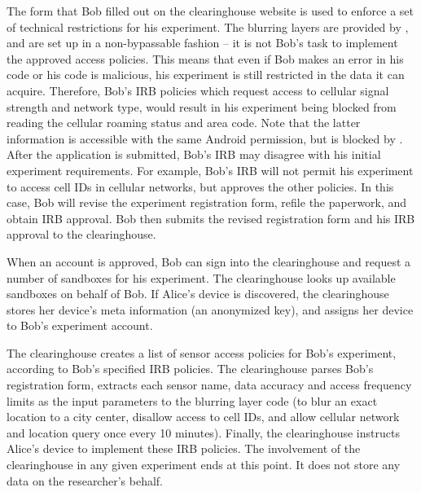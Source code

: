 The form that Bob filled out on the clearinghouse website is used to
enforce a set of technical restrictions for his experiment. 
The blurring layers are provided by 
\sysname, and are set up in a non-bypassable fashion -- it is not 
Bob's task to implement the approved access policies. This means
that even if Bob makes an error in his code or his code is malicious, his 
experiment is still restricted in the data it can acquire. 
Therefore, Bob's IRB 
policies which request access to cellular signal strength and network type, would result 
in his experiment being blocked from reading the cellular roaming status and area 
code. Note that the latter information is accessible with the same 
Android permission, but is blocked by \sysname. 
After the application is submitted, Bob's IRB may disagree with 
his initial experiment requirements. For example, Bob's IRB will not permit
his experiment to access cell IDs in cellular networks, but 
approves the other policies. 
In this case, Bob will revise the experiment registration form, refile the paperwork, 
and obtain IRB approval. Bob then submits the revised  
registration form and his IRB approval to the clearinghouse.

 When an account is approved, Bob 
can sign into the clearinghouse and request a 
number of sandboxes for his experiment. The clearinghouse 
looks up available sandboxes on behalf of Bob. If Alice's device is discovered, the 
clearinghouse stores her device's meta information (an anonymized 
key), %
and assigns her device to Bob's experiment account. 

The clearinghouse creates a list of sensor access policies for Bob's
experiment, according to Bob's specified IRB policies. The 
clearinghouse parses Bob's registration form, extracts each sensor name, 
data accuracy and access frequency limits as the 
input parameters to the blurring layer code (to blur an exact location 
to a city center, disallow access to cell IDs, and allow cellular network and 
location query once every 10 minutes). Finally, the clearinghouse 
instructs Alice's device to implement these IRB policies. The involvement 
of the clearinghouse in any given experiment ends at this point.
It does not store any data on the researcher's behalf. 

